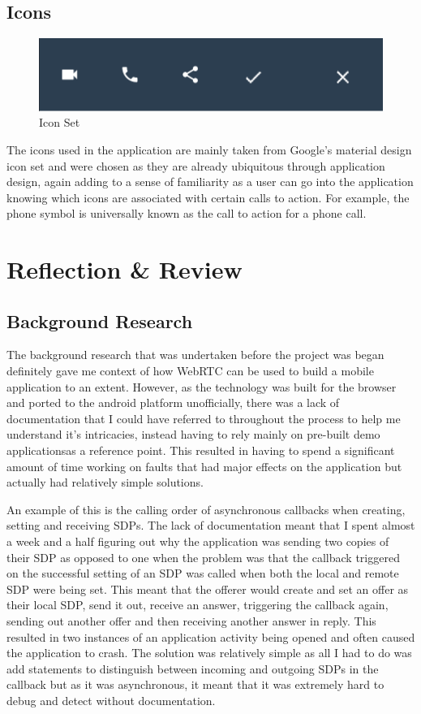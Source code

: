 \documentclass[]{report}
\begin{document}
		\section{Icons}
		\begin{figure}[H]
			\caption{Icon Set}
			\centering
			\includegraphics[scale=0.35]{iconset.png}
		\end{figure}
		The icons used in the application are mainly taken from Google's material design icon set and were chosen as they are already ubiquitous through application design, again adding to a sense of familiarity as a user can go into the application knowing which icons are associated with certain calls to action. For example, the phone symbol is universally known as the call to action for a phone call. 

	\chapter{Reflection \& Review}
		\section{Background Research}
		The background research that was undertaken before the project was began definitely gave me context of how WebRTC can be used to build a mobile application to an extent. However, as the technology was built for the browser and ported to the android platform unofficially, there was a lack of documentation that I could have referred to throughout the process to help me understand it's intricacies, instead having to rely mainly on pre-built demo applicationsas a reference point. This resulted in having to spend a significant amount of time working on faults that had major effects on the application but actually had relatively simple solutions.
		
		An example of this is the calling order of asynchronous callbacks when creating, setting and receiving SDPs. The lack of documentation meant that I spent almost a week and a half figuring out why the application was sending two copies of their SDP as opposed to one when the problem was that the callback triggered on the successful setting of an SDP was called when both the local and remote SDP were being set. This meant that the offerer would create and set an offer as their local SDP, send it out, receive an answer, triggering the callback again, sending out another offer and then receiving another answer in reply. This resulted in two instances of an application activity being opened and often caused the application to crash. The solution was relatively simple as all I had to do was add statements to distinguish between incoming and outgoing SDPs in the callback but as it was asynchronous, it meant that it was extremely hard to debug and detect without documentation.
		
\end{document}
